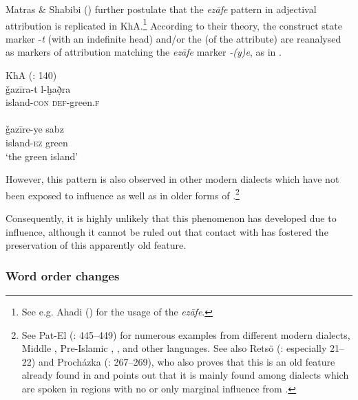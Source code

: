 \documentclass[output=paper,nonflat]{langsci/langscibook}
\begin{document}
Matras \& Shabibi (\citeyear[140]{MatrasShabibi2007}) further postulate that the  \textit{ezāfe} pattern in adjectival attribution is replicated in KhA.\footnote{See e.g. Ahadi (\citeyear[103–109]{Ahadi2001}) for the usage of the  \textit{ezāfe}.} According to their theory, the construct state marker -\textit{t} (with an indefinite head) and/or the   (of the attribute) are reanalysed as markers of attribution matching the   \textit{ezāfe} marker \textit{-(y)e}, as in . 

\ea\label{island}
\ea
{KhA (\citealt{MatrasShabibi2007}: 140)}\\
\gll ǧazīra-t l-ḫað̣ra \\
     island-\textsc{con} \textsc{def}-green.\textsc{f}\\
 
\\
\gll ǧazīre-ye sabz\\
     island-\textsc{ez} green\\
\glt ‘the green island’ 
\z\z

However, this pattern is also observed in other modern  dialects which have not been exposed to  influence as well as in older forms of .\footnote{See Pat-El (\citeyear{Pat-El2017}: 445–449) for numerous examples from different modern  dialects, Middle , Pre-Islamic ,  , and other   languages. See also Retsö (\citeyear{Retsö2009}: especially 21–22) and Procházka (\citeyear{Procházka2018Fertile}: 267–269), who also proves that this is an old feature already found in   and points out that it is mainly found among dialects which are spoken in regions with no or only marginal influence from  .} 

Consequently, it is highly unlikely that this phenomenon has developed due to  influence, although it cannot be ruled out that contact with  has fostered the preservation of this apparently old feature. 


\subsubsection{Word order changes} \label{woc}
\end{document}
